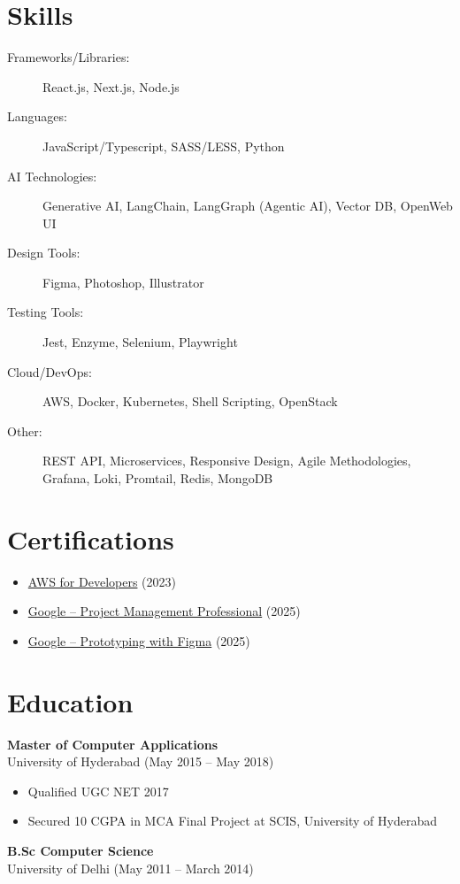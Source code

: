 \documentclass[11pt, a4paper]{article}
\newcommand{\smallgray}[1]{\textcolor{darkgray!90}{\small #1}}
\begin{document}
\section{Skills}
\begin{description}
    \item[Frameworks/Libraries:] React.js, Next.js, Node.js
    \item[Languages:] JavaScript/Typescript, SASS/LESS, Python
    \item[AI Technologies:] Generative AI, LangChain, LangGraph (Agentic AI), Vector DB, OpenWeb UI
    \item[Design Tools:] Figma, Photoshop, Illustrator
    \item[Testing Tools:] Jest, Enzyme, Selenium, Playwright
    \item[Cloud/DevOps:] AWS, Docker, Kubernetes, Shell Scripting, OpenStack
    \item[Other:] REST API, Microservices, Responsive Design, Agile Methodologies, Grafana, Loki, Promtail, Redis, MongoDB
\end{description}

\section{Certifications}
\begin{itemize}
    \item \href{https://www.dropbox.com/scl/fi/hf0k6cr86qwm2dbkb8iwb/CertificateOfCompletion_Learning-Amazon-Web-Services-AWS-for-Developers.pdf?rlkey=fo3zs0hayxttntiz3z2ax96y9&e=1&dl=0}{AWS for Developers} (2023)
    \item \href{https://www.credly.com/badges/fe8639a2-558c-45d8-8745-2f27a8415cb7/linked_in_profile}{Google -- Project Management Professional} (2025)
    \item \href{https://www.coursera.org/account/accomplishments/verify/A403DUFU26PH}{Google -- Prototyping with Figma} (2025)
\end{itemize}

\section{Education}
\textbf{Master of Computer Applications} \\
\smallgray{University of Hyderabad (May 2015 -- May 2018)}
\begin{itemize}
    \item Qualified UGC NET 2017
    \item Secured 10 CGPA in MCA Final Project at SCIS, University of Hyderabad
\end{itemize}
\textbf{B.Sc Computer Science} \\
\smallgray{University of Delhi (May 2011 -- March 2014)}

\end{document}
